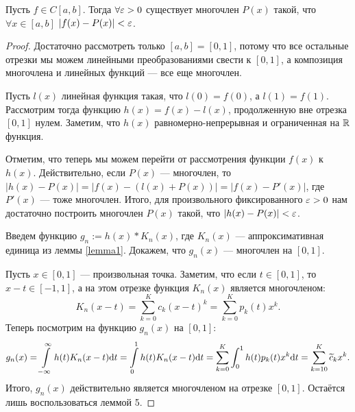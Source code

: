 \begin{Theorem}
Пусть $f \in C[a, b]$. Тогда $\forall \varepsilon > 0$ существует многочлен $P(x)$ такой, что \\$\forall x \in [a, b]$ $|f(x) - P(x)| < \varepsilon$. 
\end{Theorem}
\begin{proof}
Достаточно рассмотреть только $[a, b] = [0, 1]$, потому что все остальные отрезки мы можем линейными преобразованиями свести к $[0, 1]$, а композиция многочлена и линейных функций --- все еще многочлен.

Пусть $l(x)$ линейная функция такая, что $l(0) = f(0)$, а $l(1) = f(1)$. Рассмотрим тогда функцию $h(x) = f(x) - l(x)$, продолженную вне отрезка $[0, 1]$ нулем. Заметим, что $h(x)$ равномерно-непрерывная и ограниченная на $\mathbb{R}$ функция.

Отметим, что теперь мы можем перейти от рассмотрения функции $f(x)$ к $h(x)$. Действительно, если $P(x)$ --- многочлен, то $|h(x) - P(x)| = |f(x) - (l(x) + P(x))| = |f(x) - P'(x)|$, где $P'(x)$ --- тоже многочлен. Итого, для произвольного фиксированного $\varepsilon > 0$ нам достаточно построить многочлен $P(x)$ такой, что $|h(x) - P(x)| < \varepsilon$.

Введем функцию $g_n := h(x) * K_n(x)$, где $K_n(x)$ --- аппроксимативная единица из леммы \ref{lemma1}. Докажем, что $g_n(x)$ --- многочлен на $[0, 1]$. 

Пусть $x \in [0, 1]$ --- произвольная точка. Заметим, что если $t \in [0, 1]$, то $x - t \in [-1, 1]$, а на этом отрезке функция $K_n(x)$ является многочленом: 
$$
K_n(x - t) = \sum\limits_{k = 0}^{K}c_k(x - t)^k = \sum\limits_{k = 0}^K p_k(t)x^k.
$$
Теперь посмотрим на функцию $g_n(x)$ на $[0, 1]$:
$$
g_n(x) = \int\limits_{-\infty}^{\infty}h(t)K_n(x - t)\mathrm{d} t = \int\limits_{0}^1h(t)K_n(x - t)\mathrm{d} t = \sum\limits_{k = 0}^K \int_0^1 h(t)p_k (t) x^k \mathrm{d} t = \sum\limits_{k = 10}^K \widetilde{c}_k x^k.
$$
Итого, $g_n(x)$ действительно является многочленом на отрезке $[0, 1]$. Остаётся лишь воспользоваться леммой 5.
\end{proof}

